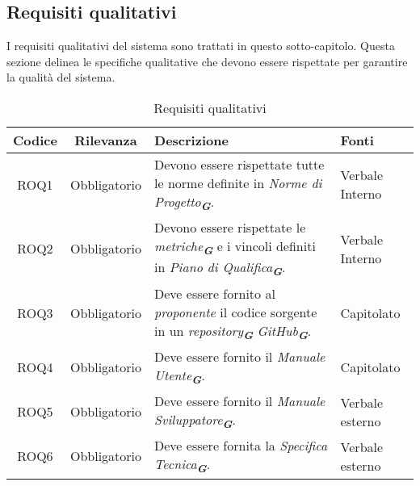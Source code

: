 \subsection{Requisiti qualitativi}
\label{sec:Requisiti_qualitativi}
I requisiti qualitativi del sistema sono trattati in questo sotto-capitolo. Questa sezione
delinea le specifiche qualitative che devono essere rispettate per garantire la qualità del
sistema.
\begin{table}[h!]
    \centering
    \renewcommand{\arraystretch}{1.6} %
    \begin{tabularx}{\textwidth}{|>{\centering\arraybackslash}c|>{\centering\arraybackslash}c|>{\centering\arraybackslash}X|>{\centering\arraybackslash}p{3cm}|} \hline
    \rowcolor[HTML]{FFD700} 
    \textbf{Codice} & \textbf{Rilevanza} & \textbf{Descrizione} & \textbf{Fonti} \\ \hline
    ROQ1 & Obbligatorio & Devono essere rispettate tutte le norme definite in \emph{Norme di Progetto}\textsubscript{\textbf{\textit{G}}}. & Verbale Interno \\ \hline
    ROQ2 & Obbligatorio & Devono essere rispettate le \emph{metriche}\textsubscript{\textbf{\textit{G}}} e i vincoli definiti in \emph{Piano di Qualifica}\textsubscript{\textbf{\textit{G}}}. & Verbale Interno \\ \hline
    ROQ3 & Obbligatorio & Deve essere fornito al \emph{proponente} il codice sorgente in un \emph{repository}\textsubscript{\textbf{\textit{G}}} \emph{GitHub}\textsubscript{\textbf{\textit{G}}}. & Capitolato \\ \hline
    ROQ4 & Obbligatorio & Deve essere fornito il \emph{Manuale Utente}\textsubscript{\textbf{\textit{G}}}. & Capitolato \\ \hline
    ROQ5 & Obbligatorio & Deve essere fornito il \emph{Manuale Sviluppatore}\textsubscript{\textbf{\textit{G}}}. & Verbale esterno \\ \hline
    ROQ6 & Obbligatorio & Deve essere fornita la \emph{Specifica Tecnica}\textsubscript{\textbf{\textit{G}}}. & Verbale esterno \\ \hline
    \end{tabularx}
    \caption{Requisiti qualitativi}
    \label{tab:Requisiti_qualitativi}
\end{table}


